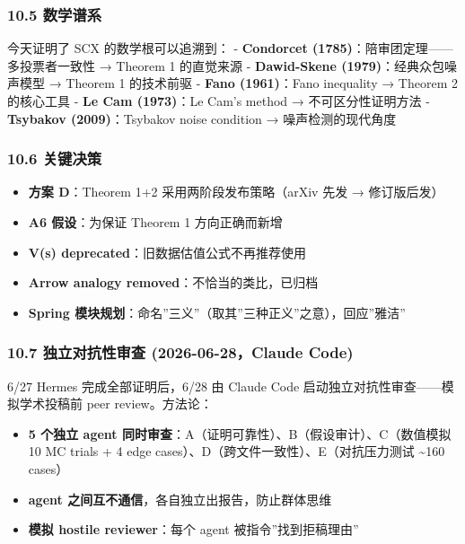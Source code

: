 \documentclass[
  12pt,
]{ctexart}
\providecommand{\tightlist}{%
  \setlength{\itemsep}{0pt}\setlength{\parskip}{0pt}}
\begin{document}
\subsubsection{10.5 数学谱系}\label{ux6570ux5b66ux8c31ux7cfb}

今天证明了 SCX 的数学根可以追溯到： - \textbf{Condorcet
(1785)}：陪审团定理------多投票者一致性 → Theorem 1 的直觉来源 -
\textbf{Dawid-Skene (1979)}：经典众包噪声模型 → Theorem 1 的技术前驱 -
\textbf{Fano (1961)}：Fano inequality → Theorem 2 的核心工具 -
\textbf{Le Cam (1973)}：Le Cam's method → 不可区分性证明方法 -
\textbf{Tsybakov (2009)}：Tsybakov noise condition → 噪声检测的现代角度

\subsubsection{10.6 关键决策}\label{ux5173ux952eux51b3ux7b56}

\begin{itemize}
\tightlist
\item
  \textbf{方案 D}：Theorem 1+2 采用两阶段发布策略（arXiv 先发 →
  修订版后发）
\item
  \textbf{A6 假设}：为保证 Theorem 1 方向正确而新增
\item
  \textbf{V(s) deprecated}：旧数据估值公式不再推荐使用
\item
  \textbf{Arrow analogy removed}：不恰当的类比，已归档
\item
  \textbf{Spring
  模块规划}：命名''三义''（取其''三种正义''之意），回应''雅洁''
\end{itemize}

\subsubsection{10.7 独立对抗性审查 (2026-06-28，Claude
Code)}\label{ux72ecux7acbux5bf9ux6297ux6027ux5ba1ux67e5-2026-06-28claude-code}

6/27 Hermes 完成全部证明后，6/28 由 Claude Code
启动独立对抗性审查------模拟学术投稿前 peer review。方法论：

\begin{itemize}
\tightlist
\item
  \textbf{5 个独立 agent
  同时审查}：A（证明可靠性）、B（假设审计）、C（数值模拟 10 MC trials +
  4 edge cases）、D（跨文件一致性）、E（对抗压力测试 \textasciitilde160
  cases）
\item
  \textbf{agent 之间互不通信}，各自独立出报告，防止群体思维
\item
  \textbf{模拟 hostile reviewer}：每个 agent 被指令''找到拒稿理由''
\end{itemize}
\end{document}
